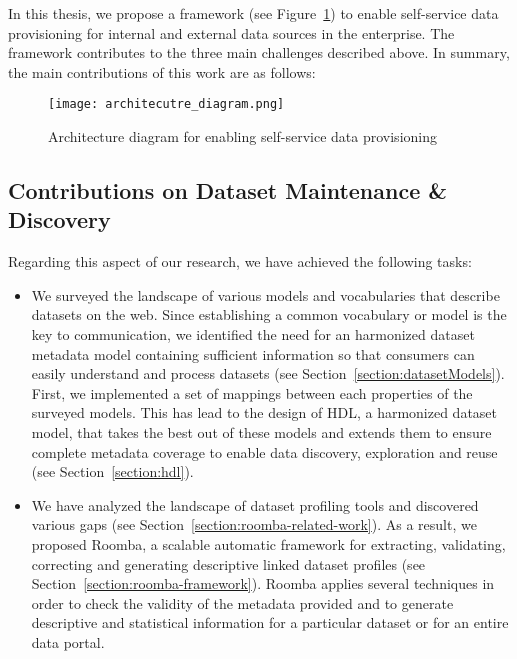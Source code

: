 In this thesis, we propose a framework (see Figure~\ref{fig:architecutre_diagram}) to enable self-service data provisioning for internal and external data sources in the enterprise. The framework contributes to the three main challenges described above. In summary, the main contributions of this work are as follows:

\begin{figure}[!ht]
  \centering
  \texttt{[image: architecutre\_diagram.png]}
  \caption{Architecture diagram for enabling self-service data provisioning}
  \label{fig:architecutre_diagram}
\end{figure}

\subsection{Contributions on Dataset Maintenance \& Discovery}

Regarding this aspect of our research, we have achieved the following tasks:
\begin{itemize}
	\item We surveyed the landscape of various models and vocabularies that describe datasets on the web. Since establishing a common vocabulary or model is the key to communication, we identified the need for an harmonized dataset metadata model containing sufficient information so that consumers can easily understand and process datasets (see Section~\ref{section:datasetModels}). First, we implemented a set of mappings between each properties of the surveyed models. This has lead to the design of HDL, a harmonized dataset model, that takes the best out of these models and extends them to ensure complete metadata coverage to enable data discovery, exploration and reuse (see Section~\ref{section:hdl}).
	\item We have analyzed the landscape of dataset profiling tools and discovered various gaps (see Section~\ref{section:roomba-related-work}). As a result, we proposed Roomba, a scalable automatic framework for extracting, validating, correcting and generating descriptive linked dataset profiles (see Section~\ref{section:roomba-framework}). Roomba applies several techniques in order to check the validity of the metadata provided and to generate descriptive and statistical information for a particular dataset or for an entire data portal.
\end{itemize}

